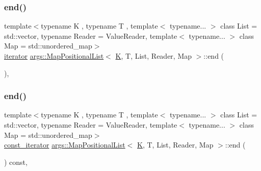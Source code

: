 \mbox{\label{classargs_1_1_map_positional_list_a3605bc6cf2e3b6d263f62938dc397148}} 
\subsubsection{\texorpdfstring{end()}{end()}\hspace{0.1cm}{\footnotesize\ttfamily [1/2]}}
{\footnotesize\ttfamily template$<$typename K , typename T , template$<$ typename... $>$ class List = std\+::vector, typename Reader  = Value\+Reader, template$<$ typename... $>$ class Map = std\+::unordered\+\_\+map$>$ \\
\hyperlink{classargs_1_1_map_positional_list_a4e3fbeb6f894505ce48d35fe76dc157a}{iterator} \hyperlink{classargs_1_1_map_positional_list}{args\+::\+Map\+Positional\+List}$<$ \hyperlink{cgal__test_8cpp_a891e241aa245ae63618f03737efba309}{K}, T, List, Reader, Map $>$\+::end (\begin{DoxyParamCaption}{ }\end{DoxyParamCaption})\hspace{0.3cm}{\ttfamily [inline]}, {\ttfamily [noexcept]}}

\mbox{\label{classargs_1_1_map_positional_list_a1bbe7a376ba441f6525b73e1ed00d457}} 
\subsubsection{\texorpdfstring{end()}{end()}\hspace{0.1cm}{\footnotesize\ttfamily [2/2]}}
{\footnotesize\ttfamily template$<$typename K , typename T , template$<$ typename... $>$ class List = std\+::vector, typename Reader  = Value\+Reader, template$<$ typename... $>$ class Map = std\+::unordered\+\_\+map$>$ \\
\hyperlink{classargs_1_1_map_positional_list_a0700556b0a067e095ee22edbb18206fc}{const\+\_\+iterator} \hyperlink{classargs_1_1_map_positional_list}{args\+::\+Map\+Positional\+List}$<$ \hyperlink{cgal__test_8cpp_a891e241aa245ae63618f03737efba309}{K}, T, List, Reader, Map $>$\+::end (\begin{DoxyParamCaption}{ }\end{DoxyParamCaption}) const\hspace{0.3cm}{\ttfamily [inline]}, {\ttfamily [noexcept]}}

